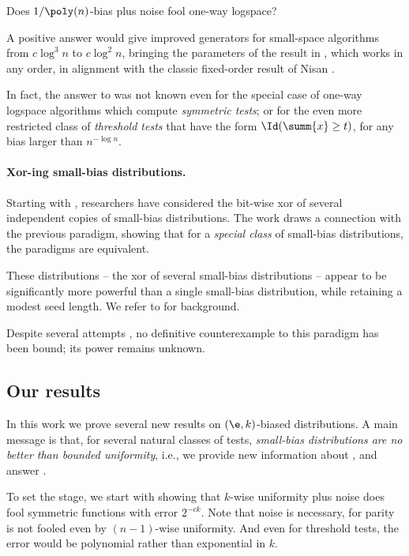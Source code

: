 \begin{question} \label{question:space}
  Does $1/\poly(n)$-bias plus noise fool one-way logspace? 
\end{question}

A positive answer would give improved generators for small-space
algorithms from $c\log^3 n $ to $c\log^2 n$, bringing the parameters of the result in \cite{ForbesKelley-2018},
which works in any order, in alignment with the classic fixed-order result of Nisan \cite{Nis92}.

In fact, the answer to  was not known even for the special case of one-way logspace algorithms which compute \emph{symmetric tests}; %
or for the even more restricted class of \emph{threshold tests} that have the form $\Id(\summ{x} \ge t)$, for any bias larger than $n^{-\log n}$.

\paragraph{Xor-ing small-bias distributions.}
Starting with \cite{BoV-gen}, researchers
have considered the bit-wise xor of several independent
copies of small-bias distributions.  The work \cite{LV-sum} draws a connection with the previous paradigm, showing that for a \emph{special class} of small-bias distributions, the paradigms are equivalent.

These distributions -- the xor of several small-bias distributions -- appear to
be significantly more powerful than a single small-bias distribution, while retaining
a modest seed length.  We refer to
\cite{ODonnell14, corr-survey, DBLP:journals/eccc/HatamiH23, moti} for background.

Despite several attempts \cite{BDVY08,MZ09,LV-sum}, no definitive counterexample to this paradigm has been bound; its power remains unknown.

\subsection{Our results}

In this work we prove several new results on $(\e,k)$-biased distributions.  A main message is that, for several natural classes of tests, \emph{small-bias distributions are no better than bounded uniformity}, i.e., we provide new information about , and answer .

To set the stage, we start with showing that $k$-wise uniformity plus noise does fool symmetric functions with error $2^{-ck}$.  Note that noise is necessary, for parity is not fooled even by $(n-1)$-wise uniformity.  And even for threshold tests, the error would be polynomial \cite{DGJSV-bifh,benjamini2012kwise} rather than exponential in $k$.

